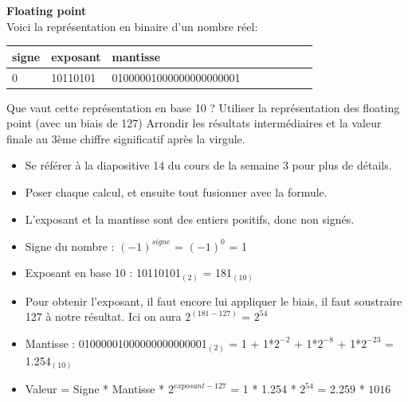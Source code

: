\begin{Exercice}[10 minutes] \textbf{Floating point}\\
    
    Voici la représentation en binaire d'un nombre réel: \\
    
     \begin{tabular}{| p{1cm} | p{3cm} | p{9.5cm} | p{1cm} | p{1cm} | p{1cm} | p{1cm} | p{1cm} | p{1cm} |} 
            \hline
            signe & exposant & mantisse \\ [0.5ex] 
            \hline
            0 & 10110101 & 01000001000000000000001 \\ [0.5ex]
            \hline
	\end{tabular}
	
    Que vaut cette représentation en base 10 ? Utiliser la représentation des floating point (avec un 
    biais de 127) Arrondir les résultats intermédiaires et la valeur finale au 3ème chiffre significatif après la virgule. \\
	
    \begin{conseil}
    
    \begin{itemize}
    	\item Se référer à la diapositive 14 du cours de la semaine 3 pour plus de détails.
    	\item Poser chaque calcul, et ensuite tout fusionner avec la formule.
    	\item L'exposant et la mantisse sont des entiers positifs, donc non signés.
    \end{itemize}
    
    \end{conseil}
    
    \begin{solution}
        \begin{itemize}
        	\item Signe du nombre : $(-1)^{signe}$ = $(-1)^0$ = 1
        	\item Exposant en base 10 : 10110101$_{(2)}$ = 181$_{(10)}$
        	\item Pour obtenir l'exposant, il faut encore lui appliquer le biais, il faut soustraire 127 à notre résultat. Ici on aura $2^{(181-127)}$ = $2^{54}$
        	\item Mantisse : 01000001000000000000001$_{(2)}$ = 1 + 1*$2^{-2}$ + 1*$2^{-8}$ + 1*$2^{-23}$ = 1.254$_{(10)}$
        	\item Valeur = Signe * Mantisse * $2^{exposant-127}$ = 1 * 1.254 * $2^{54}$ = 2.259 * $10{16}$
        \end{itemize}
    \end{solution}
\end{Exercice}
